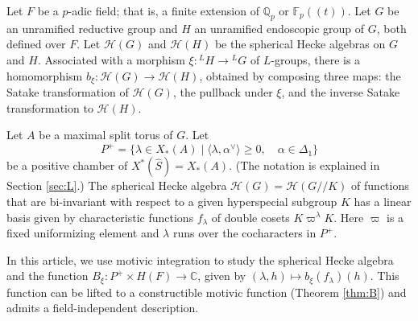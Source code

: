
% 
% 


\newcommand{\XX}[1]{{\it  [To do: #1]}}
\newcommand{\ring}[1]{\mathbb{#1}}
\newcommand{\ang}[1]{\langle{#1}\rangle}
\def\op#1{{\operatorname{#1}}}
\def\inv{\op{inv}}
\def\dom{P^+}
\def\Q{{\ring{Q}}}
\def\card{\op{card}}
\def\CSrho{[W_S\backslash C_\rho]}

\def\C{\mathcal C}
\def\N{\mathcal N}
\def\H{\mathcal H}
\def\M{\mathcal M}
\def\T{\mathcal T}
\def\D{\mathcal D}

\def\n{{\mathfrak n}}
\def\g{{\mathfrak g}}
\def\t{{\mathfrak t}}
\def\h{{\mathfrak h}}

\def\Frob{\op{Frob}}
\def\dotw{\dot w}
\def\uu{\upsilon} %

\def\libel#1{{\text{\sc [#1]~}}\label{#1}}
\def\rif#1{(\ref{#1}-{\text{\sc #1})}}




Let $F$ be a $p$-adic field; that is, a finite extension of
$\ring{Q}_p$ or $\ring{F}_p((t))$.  Let $G$ be an unramified reductive
group and $H$ an unramified endoscopic group of $G$, both defined over
$F$.  Let $\H(G)$ and $\H(H)$ be the spherical Hecke algebras on $G$
and $H$.  Associated with a morphism $\xi:{}^LH\to {}^LG$ of
$L$-groups, there is a homomorphism $b_\xi:\H(G)\to \H(H)$, obtained
by composing three maps: the Satake transformation of $\H(G)$, the
pullback under $\xi$, and the inverse Satake transformation to
$\H(H)$.

Let $A$ be a maximal split torus of $G$.  Let 
\[
\dom = \{\lambda\in X_*(A) \mid \ang{\lambda,\alpha^\vee}\ge 0,
\quad \alpha\in \Delta_1\}
\]
be a positive chamber of $X^*(\hat S) = X_*(A)$.  (The notation
is explained in Section \ref{sec:L}.)   The spherical
Hecke algebra $\H(G)=\H(G//K)$ of functions that are bi-invariant with
respect to a given hyperspecial subgroup $K$ has a linear basis given
by characteristic functions $f_\lambda$ of double cosets
$K\varpi^\lambda K$.  Here $\varpi$ is a fixed uniformizing element
and $\lambda$ runs over the cocharacters in
$P^+$.

In this article, we use motivic integration to study the spherical
Hecke algebra and the function $B_\xi:P^+\times
H(F)\to \ring{C}$, given by $(\lambda,h)\mapsto b_\xi(f_\lambda)(h)$.
This function can be lifted to a constructible motivic function
(Theorem \ref{thm:B}) and admits a field-independent description.

